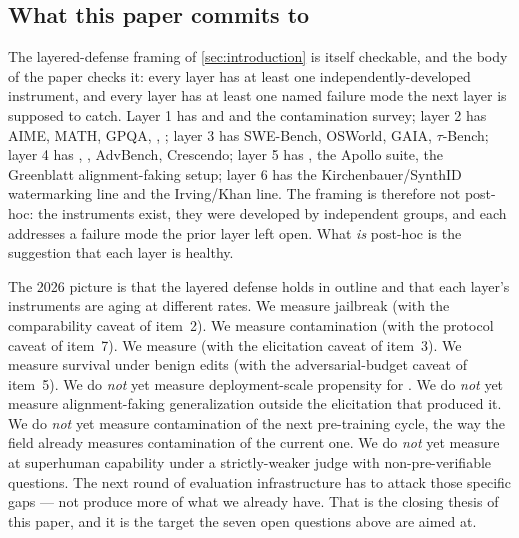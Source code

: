 \subsection{What this paper commits to}
\label{sec:contradictions-commitments}

The layered-defense framing of \cref{sec:introduction} is itself
checkable, and the body of the paper checks it: every layer has
at least one independently-developed instrument, and every layer
has at least one named failure mode the next layer is supposed to
catch. Layer 1 has  and  and the contamination
survey; layer 2 has AIME, MATH, GPQA, , ; layer 3
has SWE-Bench, OSWorld, GAIA, $\tau$-Bench; layer 4 has ,
, AdvBench, Crescendo; layer 5 has ,
the Apollo  suite, the Greenblatt alignment-faking setup;
layer 6 has the Kirchenbauer/SynthID watermarking line and the
Irving/Khan  line. The framing is therefore not post-hoc:
the instruments exist, they were developed by independent groups,
and each addresses a failure mode the prior layer left open. What
\emph{is} post-hoc is the suggestion that each layer is healthy.

The 2026 picture is that the layered defense holds in
outline and that each layer's instruments are aging at different
rates. We measure jailbreak  (with the comparability caveat of
item~2). We measure contamination (with the protocol caveat of
item~7). We measure  (with the elicitation
caveat of item~3). We measure  survival under benign
edits (with the adversarial-budget caveat of item~5). We do
\emph{not} yet measure deployment-scale propensity for .
We do \emph{not} yet measure alignment-faking generalization
outside the elicitation that produced it. We do \emph{not} yet
measure contamination of the next pre-training cycle, the way the
field already measures contamination of the current one. We do
\emph{not} yet measure  at superhuman
capability under a strictly-weaker judge with non-pre-verifiable
questions. The next round of evaluation infrastructure has to
attack those specific gaps --- not produce more of what we already
have. That is the closing thesis of this paper, and it is the
target the seven open questions above are aimed at.
